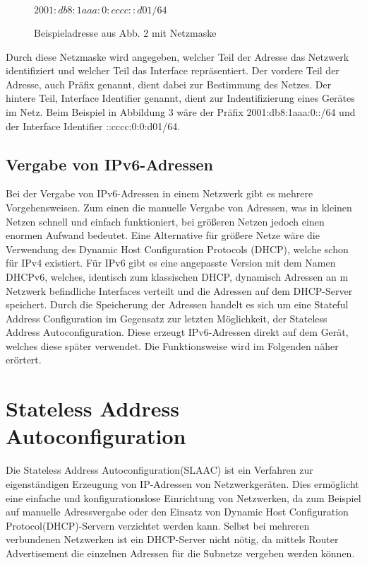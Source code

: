 \documentclass[a4paper, 12pt]{scrartcl}
\begin{document}
\begin{figure}[h]
	\centering
	$2001:db8:1aaa:0:cccc::d01/64$
	\caption{Beispieladresse aus Abb. 2 mit Netzmaske}
\end{figure}

Durch diese Netzmaske wird angegeben, welcher Teil der Adresse das Netzwerk identifiziert und welcher Teil das Interface repräsentiert. Der vordere Teil der Adresse, auch Präfix genannt, dient dabei zur Bestimmung des Netzes.
Der hintere Teil, Interface Identifier genannt, dient zur Indentifizierung eines Gerätes im Netz.
Beim Beispiel in Abbildung 3 wäre der Präfix 2001:db8:1aaa:0::/64 und der Interface Identifier ::cccc:0:0:d01/64.


\subsection{Vergabe von IPv6-Adressen}
Bei der Vergabe von IPv6-Adressen in einem Netzwerk gibt es mehrere Vorgehensweisen. Zum einen die manuelle Vergabe von Adressen, was in kleinen Netzen schnell und einfach funktioniert, bei größeren Netzen jedoch einen enormen Aufwand bedeutet. 
Eine Alternative für größere Netze wäre die Verwendung des Dynamic Host Configuration Protocols (DHCP), welche schon für IPv4 existiert. Für IPv6 gibt es eine angepasste Version mit dem Namen DHCPv6, welches, identisch zum klassischen DHCP, dynamisch Adressen an m Netzwerk befindliche Interfaces verteilt und die Adressen auf dem DHCP-Server speichert. Durch die Speicherung der Adressen handelt es sich um eine Stateful Address Configuration im Gegensatz zur letzten Möglichkeit, der Stateless Address Autoconfiguration. 
Diese erzeugt IPv6-Adressen direkt auf dem Gerät, welches diese später verwendet. Die Funktionsweise wird im Folgenden näher erörtert.


\newpage

\section{Stateless Address Autoconfiguration}
Die Stateless Address Autoconfiguration(SLAAC) ist ein Verfahren zur eigenständigen Erzeugung von IP-Adressen von Netzwerkgeräten.
Dies ermöglicht eine einfache und konfigurationslose Einrichtung von Netzwerken, da zum Beispiel auf manuelle Adressvergabe oder den Einsatz von Dynamic Host Configuration Protocol(DHCP)-Servern verzichtet werden kann.
Selbst bei mehreren verbundenen Netzwerken ist ein DHCP-Server nicht nötig, da mittels Router Advertisement die einzelnen Adressen für die Subnetze vergeben werden können.
\end{document}
